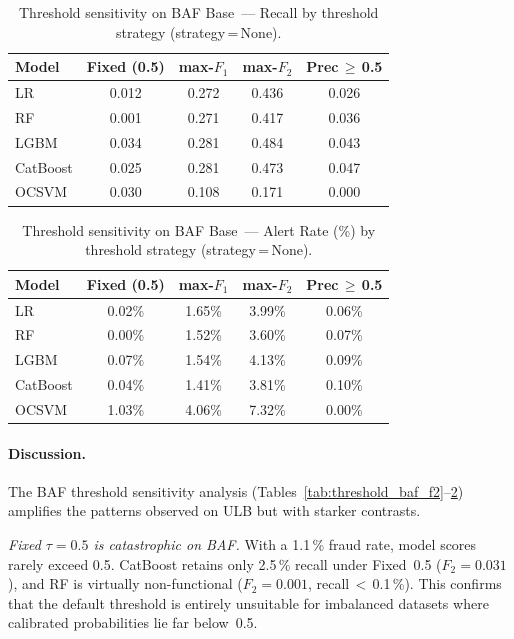 \begin{table}[ht]
\centering
\caption{Threshold sensitivity on BAF Base~--- Recall by threshold strategy (strategy\,=\,None).}
\label{tab:threshold_baf_recall}
\begin{tabular}{l c c c c}
\toprule
Model & Fixed (0.5) & max-$F_1$ & max-$F_2$ & Prec\,$\geq$\,0.5 \\
\midrule
LR         & 0.012 & 0.272 & 0.436 & 0.026 \\
RF         & 0.001 & 0.271 & 0.417 & 0.036 \\
LGBM       & 0.034 & 0.281 & 0.484 & 0.043 \\
CatBoost   & 0.025 & 0.281 & 0.473 & 0.047 \\
OCSVM      & 0.030 & 0.108 & 0.171 & 0.000 \\
\bottomrule
\end{tabular}
\end{table}

\begin{table}[ht]
\centering
\caption{Threshold sensitivity on BAF Base~--- Alert Rate (\%) by threshold strategy (strategy\,=\,None).}
\label{tab:threshold_baf_alert}
\begin{tabular}{l c c c c}
\toprule
Model & Fixed (0.5) & max-$F_1$ & max-$F_2$ & Prec\,$\geq$\,0.5 \\
\midrule
LR         & 0.02\% & 1.65\% & 3.99\% & 0.06\% \\
RF         & 0.00\% & 1.52\% & 3.60\% & 0.07\% \\
LGBM       & 0.07\% & 1.54\% & 4.13\% & 0.09\% \\
CatBoost   & 0.04\% & 1.41\% & 3.81\% & 0.10\% \\
OCSVM      & 1.03\% & 4.06\% & 7.32\% & 0.00\% \\
\bottomrule
\end{tabular}
\end{table}

\paragraph{Discussion.}
The BAF threshold sensitivity analysis
(Tables~\ref{tab:threshold_baf_f2}--\ref{tab:threshold_baf_alert})
amplifies the patterns observed on ULB but with starker contrasts.

\textit{Fixed $\tau=0.5$ is catastrophic on BAF.}
With a 1.1\,\% fraud rate, model scores rarely exceed 0.5.
CatBoost retains only 2.5\,\% recall under Fixed~0.5 ($F_2=0.031$),
and RF is virtually non-functional ($F_2=0.001$, recall\,$<$\,0.1\,\%).
This confirms that the default threshold is entirely unsuitable for
imbalanced datasets where calibrated probabilities lie far below~0.5.

